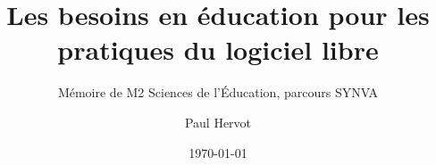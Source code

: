 \titlehead{}
\title{Les besoins en éducation pour les pratiques du logiciel libre}
\subtitle{Mémoire de M2 Sciences de l'Éducation, parcours SYNVA}
\author[PH]{Paul Hervot}
\date{\today}
\publishers{Université de Strasbourg} %

\frontmatter



\mainmatter
{}














\appendix




\backmatter



